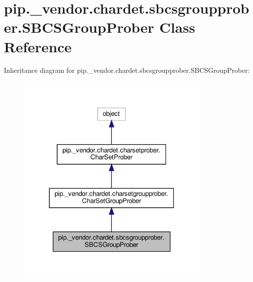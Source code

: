 \hypertarget{classpip_1_1__vendor_1_1chardet_1_1sbcsgroupprober_1_1SBCSGroupProber}{}\section{pip.\+\_\+vendor.\+chardet.\+sbcsgroupprober.\+S\+B\+C\+S\+Group\+Prober Class Reference}
\label{classpip_1_1__vendor_1_1chardet_1_1sbcsgroupprober_1_1SBCSGroupProber}


Inheritance diagram for pip.\+\_\+vendor.\+chardet.\+sbcsgroupprober.\+S\+B\+C\+S\+Group\+Prober\+:
\nopagebreak
\begin{figure}[H]
\begin{center}
\leavevmode
\includegraphics[width=271pt]{classpip_1_1__vendor_1_1chardet_1_1sbcsgroupprober_1_1SBCSGroupProber__inherit__graph}
\end{center}
\end{figure}


